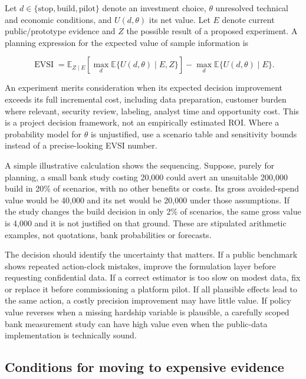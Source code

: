 Let \(d\in\{\text{stop},\text{build},\text{pilot}\}\) denote an
investment choice, \(\theta\) unresolved technical and economic
conditions, and \(U(d,\theta)\) its net value. Let \(E\) denote current
public/prototype evidence and \(Z\) the possible result of a proposed
experiment. A planning expression for the expected value of sample
information is

\[
\operatorname{EVSI}
=\mathbb E_{Z\mid E}\!\left[\max_d\mathbb E\{U(d,\theta)\mid E,Z\}\right]
-\max_d\mathbb E\{U(d,\theta)\mid E\}.
\]

An experiment merits consideration when its expected decision
improvement exceeds its full incremental cost, including data
preparation, customer burden where relevant, security review, labeling,
analyst time and opportunity cost. This is a project decision framework,
not an empirically estimated ROI. Where a probability model for
\(\theta\) is unjustified, use a scenario table and sensitivity bounds
instead of a precise-looking EVSI number.

A simple illustrative calculation shows the sequencing. Suppose, purely
for planning, a small bank study costing 20,000 could avert an
unsuitable 200,000 build in 20\% of scenarios, with no other benefits or
costs. Its gross avoided-spend value would be 40,000 and its net would
be 20,000 under those assumptions. If the study changes the build
decision in only 2\% of scenarios, the same gross value is 4,000 and it
is not justified on that ground. These are stipulated arithmetic
examples, not quotations, bank probabilities or forecasts.

The decision should identify the uncertainty that matters. If a public
benchmark shows repeated action-clock mistakes, improve the formulation
layer before requesting confidential data. If a correct estimator is too
slow on modest data, fix or replace it before commissioning a platform
pilot. If all plausible effects lead to the same action, a costly
precision improvement may have little value. If policy value reverses
when a missing hardship variable is plausible, a carefully scoped bank
measurement study can have high value even when the public-data
implementation is technically sound.

\hypertarget{conditions-for-moving-to-expensive-evidence}{%
\subsection{Conditions for moving to expensive
evidence}\label{conditions-for-moving-to-expensive-evidence}}

